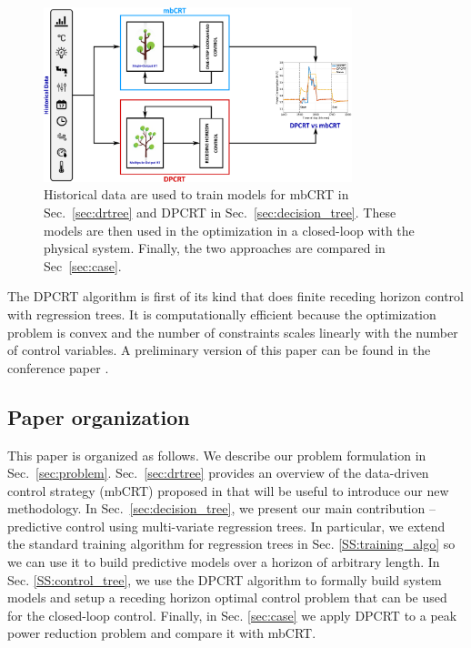 \begin{figure}[t!]
	\begin{center}
		\hspace{0.8cm}
		\includegraphics[width=0.8\textwidth]{figs/scheme.eps}
		\centering
		\caption{Historical data are used to train models for mbCRT in Sec.~\ref{sec:drtree} and DPCRT in Sec.~\ref{sec:decision_tree}. These models are then used in the optimization in a closed-loop with the physical system. Finally, the two approaches are compared in Sec~\ref{sec:case}.}
		\label{F:scheme}
		\vspace{-10pt}
	\end{center}
\end{figure}

The DPCRT algorithm is first of its kind that does finite receding horizon control with regression trees. 
It is computationally efficient because the optimization problem is convex and the number of constraints scales linearly with the number of control variables. 
A preliminary version of this paper can be found in the conference paper \cite{JainBuildsys2016}.

\subsection{Paper organization}

This paper is organized as follows. We describe our problem formulation in Sec.~\ref{sec:problem}. 
Sec.~\ref{sec:drtree} provides an overview of the data-driven control strategy (mbCRT) proposed in \cite{Behl201630} that will be useful to introduce our new methodology. 
In Sec.~\ref{sec:decision_tree}, we present our main contribution -- predictive control using multi-variate regression trees. 
In particular, we extend the standard training algorithm for regression trees in Sec. \ref{SS:training_algo} so we can use it to build predictive models over a horizon of arbitrary length. 
In Sec. \ref{SS:control_tree}, we use the DPCRT algorithm to formally build system models and setup a receding horizon optimal control problem that can be used for the closed-loop control. 
Finally, in Sec. \ref{sec:case} we apply DPCRT to a peak power reduction problem and compare it with mbCRT.

